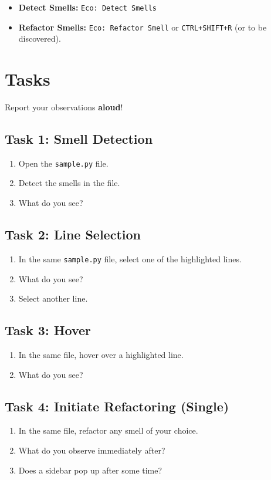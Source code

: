 \documentclass[12pt, titlepage]{article}
\begin{document}
\begin{itemize}
  \item \textbf{Detect Smells:} \texttt{Eco: Detect Smells}
  \item \textbf{Refactor Smells:} \texttt{Eco: Refactor Smell} or
    \texttt{CTRL+SHIFT+R} (or to be discovered).
\end{itemize}

\section*{Tasks}
Report your observations \textbf{aloud}!

\subsection*{Task 1: Smell Detection}
\begin{enumerate}
  \item Open the \texttt{sample.py} file.
  \item Detect the smells in the file.
  \item What do you see?
\end{enumerate}

\subsection*{Task 2: Line Selection}
\begin{enumerate}
  \item In the same \texttt{sample.py} file, select one of the
    highlighted lines.
  \item What do you see?
  \item Select another line.
\end{enumerate}

\subsection*{Task 3: Hover}
\begin{enumerate}
  \item In the same file, hover over a highlighted line.
  \item What do you see?
\end{enumerate}

\subsection*{Task 4: Initiate Refactoring (Single)}
\begin{enumerate}
  \item In the same file, refactor any smell of your choice.
  \item What do you observe immediately after?
  \item Does a sidebar pop up after some time?
\end{enumerate}
\end{document}
